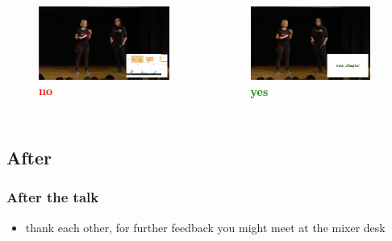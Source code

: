 \documentclass[hyperref={pdfpagelabels=false},aspectratio=169]{beamer}
\begin{document}
\begin{frame}
	\begin{columns}[T,onlytextwidth]
	\begin{figure} 
		\centering
		\def\svgwidth{1\textwidth}
		\includegraphics[width=1\textwidth]{ssrcfckup.png} \\
		\textcolor{red}{\textbf{no}}	
	\end{figure}
	\begin{figure} 
		\centering
		\def\svgwidth{1\textwidth}
		\includegraphics[width=0.92\textwidth]{ssrcbetter.png} \\
		\textcolor{green}{\textbf{yes}}	
	\end{figure}
\end{columns}
\end{frame}


\subsection{After} %
\begin{frame}
\frametitle{After the talk}
\begin{itemize}
\item thank each other, for further feedback you might meet at the mixer desk
\end{itemize} 
\end{frame}
\end{document}
